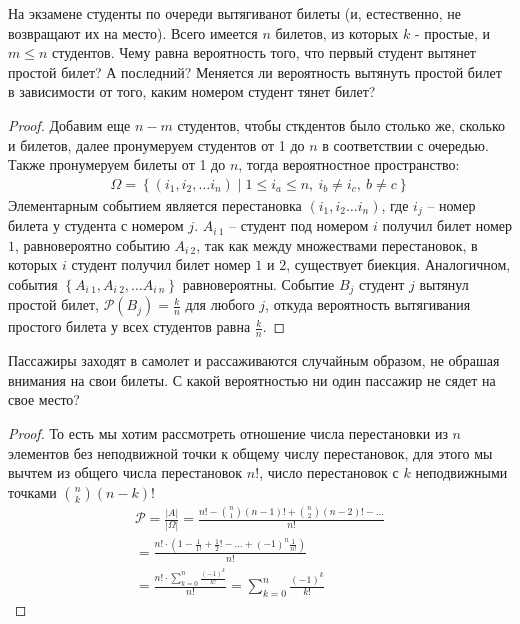     \begin{prob}
        На экзамене студенты по очереди вытягиванот билеты (и, естественно, не возвращают их на место). Всего имеется $n$ билетов, из которых $k$ - простые, и $m \leq n$ студентов. Чему равна вероятность того, что первый студент вытянет простой билет? А последний? Меняется ли вероятность вытянуть простой билет в зависимости от того, каким номером студент тянет билет?
    \end{prob}
    \begin{proof}
        Добавим еще $n-m$ студентов, чтобы сткдентов было столько же, сколько и билетов, далее пронумеруем студентов от 1 до $n$ в соответствии с очередью. Также пронумеруем билеты от 1 до $n$, тогда вероятностное пространство:
        \begin{gather*}
            \Omega=\left\{\left(i_{1}, i_{2}, \ldots i_{n}\right) \mid 1 \leqslant i_{a} \leqslant n,\ i_{b} \neq i_{c},\ b \neq c\right\}
        \end{gather*}
        Элементарным событием является перестановка $\left(i_{1}, i_{2} \ldots i_{n}\right)$, где $i_j$ -- номер билета у студента с номером $j$.
        \vskip 0.1in
        $A_{i\: 1}$ -- студент под номером $i$ получил билет номер $1$, равновероятно событию $A_{i\ 2}$, так как между множествами перестановок, в которых $i$ студент получил билет номер $1$ и $2$, существует биекция. Аналогичном, события $\left\{A_{i\: 1}, A_{i\: 2}, \ldots A_{i\: n}\right\}$ равновероятны.
        \vskip 0.1in
        Событие $B_{j}$ студент $j$ вытянул простой билет, $\mathcal{P}(B_{j})=\frac{k}{n}$ для любого $j$, откуда вероятность вытягивания простого билета у всех студентов равна $\frac{k}{n}$.
    \end{proof}
\vskip 0.6in


    \begin{prob}
        Пассажиры заходят в самолет и рассаживаются случайным образом, не обрашая внимания на свои билеты. С какой вероятностью ни один пассажир не сядет на свое место?
    \end{prob}
    \begin{proof}
        То есть мы хотим рассмотреть отношение числа перестановки из $n$ элементов без неподвижной точки к общему числу перестановок, для этого мы вычтем из общего числа перестановок $n!$, число перестановок с $k$ неподвижными точками ${{n}\choose{k}} (n-k)!$
        \begin{gather*}
            \mathcal{P} = \frac{|A|}{|\Omega|}
            = \frac{n! - {{n}\choose{1}} (n-1)! + {{n}\choose{2}} (n-2)! - \ldots}{n!}\\
            = \frac{n! \cdot \left(1 - \frac{1}{1!} + \frac{1}{2}! - \ldots + (-1)^n \frac{1}{n!}\right)}{n!}\\
            = \frac{n! \cdot \sum\limits_{k = 0}^{n} \frac{(-1)^k}{k!}}{n!}
            = \sum\limits_{k = 0}^{n} \frac{(-1)^k}{k!}
        \end{gather*}
    \end{proof}
\vskip 0.6in


